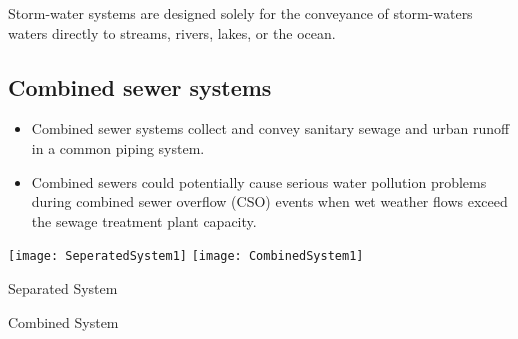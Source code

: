 Storm-water systems are designed solely for the conveyance of storm-waters waters directly to streams, rivers, lakes, or the ocean.
 
\subsection{Combined sewer systems}
\begin{itemize}
\item Combined sewer systems collect and convey sanitary sewage and urban runoff in a common piping system.
\item Combined sewers could potentially cause serious water pollution problems during combined sewer overflow (CSO) events when wet weather flows exceed the sewage treatment plant capacity.
	\end{itemize}
\begin{center}
\texttt{[image: SeperatedSystem1]} \hspace{1 cm} \texttt{[image: CombinedSystem1]}
\end{center}
			\hspace{2.6cm} Separated System \hspace{3.2cm} \parbox{\textwidth}{Combined System}\\

